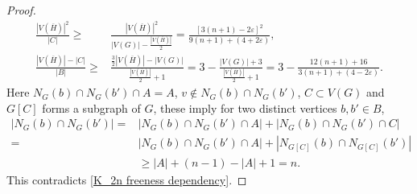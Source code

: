 \documentclass[reqno,10pt]{amsart}
\theoremstyle{definition}
\begin{document}
\begin{proof}
\begin{align*}
\frac{|V(\overline{H})|^{2}}{|C|}\geq&\frac{|V(\overline{H})|^{2}}{|V(G)|-\frac{|V(\overline{H})|}{2}}=\frac{[3(n+1)-2\varepsilon]^{2}}{9(n+1)+(4+2\varepsilon)},\\
\frac{|V(\overline{H})|-|C|}{|B|}\geq&\frac{\frac{3}{2}|V(\overline{H})|-|V(G)|}{\frac{|V(\overline{H})|}{2}+1}=3-\frac{|V(G)|+3}{\frac{|V(\overline{H})|}{2}+1}=3-\frac{12(n+1)+16}{3(n+1)+(4-2\varepsilon)}.
\end{align*}
Here $N_{G}(b)\cap N_{G}(b')\cap A=A$, $v\notin N_{G}(b)\cap N_{G}(b')$, $C\subset V(G)$ and $G[C]$ forms a subgraph of $G$, these imply
for two distinct vertices $b,b'\in B$,
\begin{align*}
|N_{G}(b)\cap N_{G}(b')|=&|N_{G}(b)\cap N_{G}(b')\cap A|+|N_{G}(b)\cap N_{G}(b')\cap C|\\
=&|N_{G}(b)\cap N_{G}(b')\cap A|+|N_{G[C]}(b)\cap N_{G[C]}(b')|\\
&\geq |A|+(n-1)-|A|+1=n.
\end{align*}
This contradicts \eqref{K_2n freeness dependency}.
\end{proof}
\end{document}
